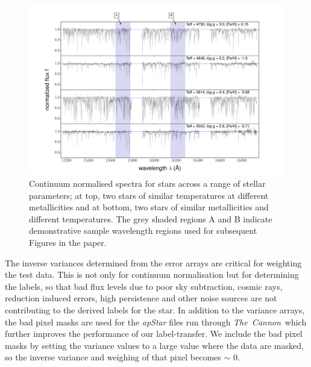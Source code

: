 \documentclass[12pt, preprint]{aastex}
\newcommand{\tc}{\textsl{The~Cannon}}
\begin{document}

\begin{figure}[h!]
  \includegraphics[width=\hsize]{./plots/four_examples3.pdf}
\caption{Continuum normalised spectra for stars across a range of stellar parameters; at top, two stars of similar temperatures at different metallicities and at bottom, two stars of similar metallicities and different temperatures. The grey shaded regions A and B indicate demonstrative sample wavelength regions used for subsequent Figures in the paper.}
\label{fig:norm}
\end{figure}


The inverse variances determined from the error arrays are critical for weighting the test data. 
This is not only for continuum normalisation but for determining the labels, so that bad flux levels due to poor sky subtraction, cosmic rays, reduction induced errors, high persistence and other noise sources are not contributing to the derived labels for the star. 
In addition to the variance arrays, the bad pixel masks are used for the \textit{apStar} files run through \tc\, which further improves the performance of our label-transfer. 
We include the bad pixel masks by setting the variance values to a large value where the data are masked, so the inverse variance and weighing of that pixel becomes $\sim$ 0. 
\end{document}
